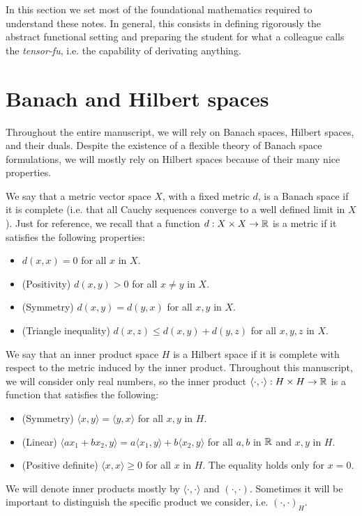 In this section we set most of the foundational mathematics required to understand these notes. In general, this consists in defining rigorously the abstract functional setting and preparing the student for what a colleague calls the \emph{tensor-fu}, i.e. the capability of derivating anything. 

\section{Banach and Hilbert spaces}
Throughout the entire manuscript, we will rely on Banach spaces, Hilbert spaces, and their duals. Despite the existence of a flexible theory of Banach space formulations, we will mostly rely on Hilbert spaces because of their many nice properties. 

\begin{definition}
    We say that a metric vector space $X$, with a fixed metric $d$, is a Banach space if it is complete (i.e. that all Cauchy sequences converge to a well defined limit in $X$). Just for reference, we recall that a function $d:X\times X\to \mathbb{R}$ is a metric if it satisfies the following properties: 
    \begin{itemize}
        \item $d(x,x) = 0$ for all $x$ in $X$. 
        \item (Positivity) $d(x,y) > 0$ for all $x\neq y$ in $X$. 
        \item (Symmetry) $d(x,y) = d(y,x)$ for all $x,y$ in $X$. 
        \item (Triangle inequality) $d(x,z) \leq d(x,y) + d(y,z)$ for all $x,y,z$ in $X$. 
    \end{itemize}
\end{definition}

\begin{definition}
    We say that an inner product space $H$ is a Hilbert space if it is complete with respect to the metric induced by the inner product. Throughout this manuscript, we will consider only real numbers, so the inner product $\langle\cdot, \cdot\rangle: H\times H \to \mathbb{R}$ is a function that satisfies the following: 
    \begin{itemize}
        \item (Symmetry) $\langle x,y\rangle = \langle y,x\rangle$ for all $x,y$ in $H$.
        \item (Linear) $\langle ax_1 + bx_2, y\rangle = a\langle x_1, y\rangle + b\langle x_2, y\rangle$ for all $a,b$ in $\mathbb{R}$ and $x,y$ in $H$. 
        \item (Positive definite) $\langle x, x\rangle \geq 0$ for all $x$ in $H$. The equality holds only for $x=0$. 
    \end{itemize}
    We will denote inner products mostly by $\langle\cdot, \cdot\rangle$ and $(\cdot, \cdot)$. Sometimes it will be important to distinguish the specific product we consider, i.e. $(\cdot, \cdot)_H$. 
\end{definition}

